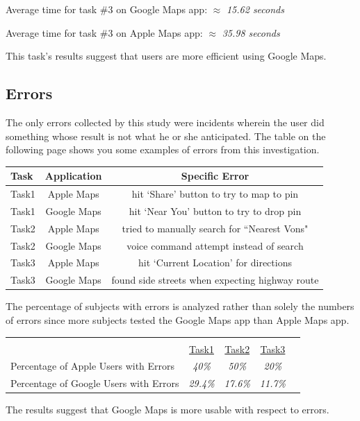 \documentclass[a4paper; 11pt]{article}
\begin{document}
\begin{center}
\vspace{-.6in}

\par
Average time for task \#3 on Google Maps app: $ \approx $ \textit{15.62 seconds}
\par
Average time for task \#3 on Apple Maps app: $ \approx $ \textit{35.98 seconds}
\end{center}
\par
\noindent
This task's results suggest that users are more efficient using Google Maps. 
\clearpage
\subsection{Errors}
\par
The only errors collected by this study were incidents wherein the user did something whose result is not what he or she anticipated. The table on the following page shows you some examples of errors from this investigation.

\begin{table}[ht]
\centering
\begin{tabular}{l|c|c}
Task & Application & Specific Error\\\hline
Task1 & Apple Maps & hit `Share' button to try to map to pin \\
Task1 & Google Maps & hit `Near You' button to try to drop pin\\
Task2 & Apple Maps & tried to manually search for ``Nearest Vons"\\
Task2 & Google Maps & voice command attempt instead of search\\
Task3 & Apple Maps & hit `Current Location' for directions\\
Task3 & Google Maps & found side streets when expecting highway route
\end{tabular}
\end{table}
\par
The percentage of subjects with errors is analyzed rather than solely the numbers of errors since more subjects tested the Google Maps app than Apple Maps app.
\begin{table}[ht]
\begin{tabular}{l c c c c}
& \multicolumn{4}{c}{}\\ %
& \underline{Task1} & \underline{Task2} & \underline{Task3} \\
Percentage of Apple Users with Errors & \textit{40\%} & \textit{50\%}  & \textit{20\%} \\
Percentage of Google Users with Errors & \textit{29.4\%} & \textit{17.6\%}  & \textit{11.7\%} \\

\end{tabular}

\end{table}
\par
The results suggest that Google Maps is more usable with respect to errors.
\end{document}

